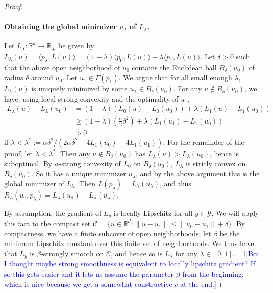 \documentclass{article}
\theoremstyle{definition}\newtheorem{definition}{Definition}
\theoremstyle{definition}\newtheorem{assumption}{Assumption}
\newcommand{\Comments}{1}
\newcommand{\mynote}[2]{\ifnum\Comments=1\textcolor{#1}{#2}\fi}
\newcommand{\bo}[1]{\mynote{blue}{[Bo: #1]}}
\newcommand{\reals}{\mathbb{R}}
\newcommand{\Y}{\mathcal{Y}}
\newcommand{\risk}[1]{\underline{#1}}
\newcommand{\inprod}[2]{\langle #1, #2 \rangle}%
\begin{document}
\begin{proof}
  \paragraph{Obtaining the global minimizer $u_{\lambda}$ of $L_{\lambda}$.}
  Let $L_\lambda:\reals^d\to\reals_+$ be given by $L_\lambda(u) = \inprod{p_\lambda}{L(u)} = (1-\lambda) \inprod{p_0}{L(u)} + \lambda \inprod{p_1}{L(u)}$.
  Let $\delta >0$ such that the above open neighborhood of $u_0$ contains the Euclidean ball $B_\delta(u_0)$ of radius $\delta$ around $u_0$.
  Let $u_1 \in \Gamma(p_1)$.
  We argue that for all small enough $\lambda$, $L_{\lambda}(u)$ is uniquely minimized by some $u_{\lambda} \in B_{\delta}(u_0)$.
  For any $u\notin B_\delta(u_0)$, we have, using local strong convexity and the optimality of $u_1$,
  \begin{align*}
    L_\lambda(u) - L_\lambda(u_0)
    &=
      (1-\lambda) \left( L_0(u) - L_0(u_0) \right)
      + \lambda \left( L_1(u) - L_1(u_0) \right)
    \\
    &\geq
      (1-\lambda) \left( \frac \alpha 2 \delta^2 \right)
      + \lambda \left( L_1(u_1) - L_1(u_0) \right)~  \\
    &> 0
  \end{align*}
  if $\lambda < \lambda^* := \alpha \delta^2 / (2 \alpha \delta^2 + 4 L_1(u_0) - 4 L_1(u_1))$.
  For the remainder of the proof, let $\lambda < \lambda^*$.
  Then any $u\notin B_{\delta}(u_0)$ has $L_{\lambda}(u) > L_{\lambda}(u_0)$, hence is suboptimal.
  By $\alpha$-strong convexity of $L_0$ on $B_\delta(u_0)$, $L_\lambda$ is stricly convex on $B_\delta(u_0)$.
  So it has a unique minimizer $u_{\lambda}$, and by the above argument this is the global minimizer of $L_{\lambda}$.
  Then $\risk{L}(p_\lambda) = L_\lambda(u_\lambda)$, and thus $R_L(u_0,p_\lambda) = L_\lambda(u_0) - L_\lambda(u_\lambda)$.

  By assumption, the gradient of $L_y$ is locally Lipschitz for all $y\in\Y$.
  We will apply this fact to the compact set $\mathcal C = \{u \in \reals^d : \|u - u_1\| \leq \|u_0 - u_1\| + \delta\}$.
  By compactness, we have a finite subcover of open neighborhoods; let $\beta$ be the minimum Lipschitz constant over this finite set of neighborhoods.
  We thus have that $L_y$ is $\beta$-strongly smooth on $\mathcal C$, and hence so is $L_\lambda$ for any $\lambda \in [0,1]$.
  \bo{I thought maybe strong smoothness is equivalent to locally lipschitz gradient? If so this gets easier and it lets us assume the parameter $\beta$ from the beginning, which is nice because we get a somewhat constructive $c$ at the end.}
  

\end{proof}
\end{document}
